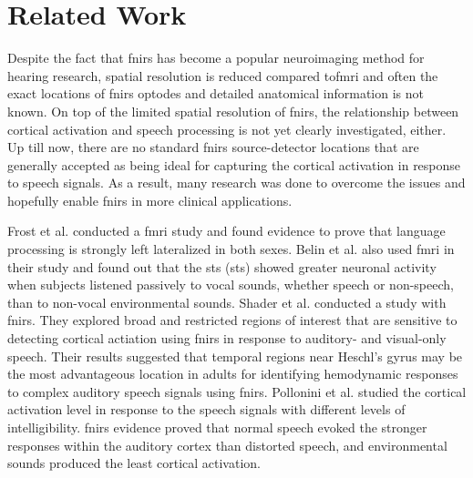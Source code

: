 \section{Related Work}


Despite the fact that \acrshort{fnirs} has become a popular neuroimaging method for hearing research, spatial resolution is reduced compared to\acrshort{fmri} and often the exact locations of \acrshort{fnirs} optodes and detailed anatomical information is not known. On top of the limited spatial resolution of \acrshort{fnirs}, the relationship between cortical activation and speech processing is not yet clearly investigated, either. Up till now,  there are no standard \acrshort{fnirs} source-detector locations that are generally accepted as being ideal for capturing the cortical activation in response to speech signals. As a result, many research was done to overcome the issues and hopefully enable \acrshort{fnirs} in more clinical applications.

Frost et al. \citeyear {Frost1999-vs} conducted a \acrshort{fmri} study and found evidence to prove that language processing is strongly left lateralized in both sexes. Belin et al. \citeyear {Belin2000} also used \acrshort{fmri} in their study and found out that the \acrlong{sts} (\acrshort{sts}) showed greater neuronal activity when subjects listened passively to vocal sounds, whether speech or non-speech, than to non-vocal environmental sounds. Shader et al. \citeyear {Shader2021} conducted a study with  \acrshort{fnirs}. They explored broad and restricted regions of interest that are sensitive to detecting cortical actiation using  \acrshort{fnirs} in response to auditory- and visual-only speech. Their results suggested that temporal regions near Heschl's gyrus may be the most advantageous location in adults for identifying hemodynamic responses to complex auditory speech signals using \acrshort{fnirs}. Pollonini et al. \citeyear{Pollonini2013} studied the cortical activation level in response to the speech signals with different levels of intelligibility.  \acrshort{fnirs} evidence proved that normal speech evoked the stronger responses within the auditory cortex than distorted speech, and environmental sounds produced the least cortical activation.



